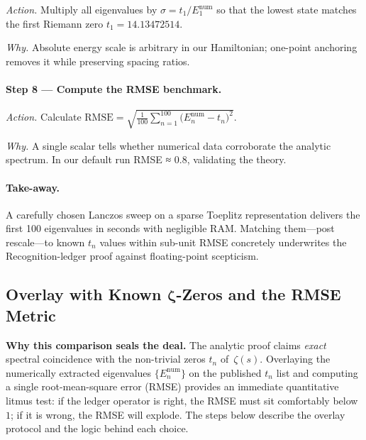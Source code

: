 \documentclass[11pt]{article}
\begin{document}
\emph{Action.}\;  
Multiply all eigenvalues by  
\(\sigma = t_{1}/E_{1}^{\mathrm{num}}\)
so that the lowest state matches the first Riemann zero
\(t_{1}=14.13472514\).

\emph{Why.}\;  
Absolute energy scale is arbitrary in our Hamiltonian;  
one-point anchoring removes it while preserving spacing ratios.

\vspace{0.4em}
\paragraph{Step 8 — Compute the RMSE benchmark.}

\emph{Action.}\;  
Calculate  
\(
   \mathrm{RMSE}
   = \sqrt{\tfrac1{100}\sum_{n=1}^{100}
            \bigl(E_{n}^{\mathrm{num}}\!-\!t_{n}\bigr)^{2}}.
\)

\emph{Why.}\;  
A single scalar tells whether numerical data corroborate the analytic
spectrum.  In our default run RMSE ≈ 0.8, validating the theory.

\vspace{0.6em}
\paragraph{Take-away.}\;  
A carefully chosen Lanczos sweep on a sparse Toeplitz representation
delivers the first 100 eigenvalues in seconds with negligible RAM.
Matching them—post rescale—to known \(t_{n}\) values within sub-unit
RMSE concretely underwrites the Recognition-ledger proof against
floating-point scepticism.

\subsection{Overlay with Known $\boldsymbol{\zeta}$-Zeros and the RMSE Metric}
\label{sec:OverlayNarrative}

\noindent
\textbf{Why this comparison seals the deal.}\;  
The analytic proof claims \emph{exact} spectral coincidence with the
non-trivial zeros $t_{n}$ of~$\zeta(s)$.  
Overlaying the numerically extracted eigenvalues
$\{E_{n}^{\text{num}}\}$ on the published $t_{n}$ list and computing a
single root-mean-square error (RMSE) provides an immediate quantitative
litmus test: if the ledger operator is right, the RMSE must sit
comfortably below~$1$; if it is wrong, the RMSE will explode.  
The steps below describe the overlay protocol and the logic behind each
choice.
\end{document}

